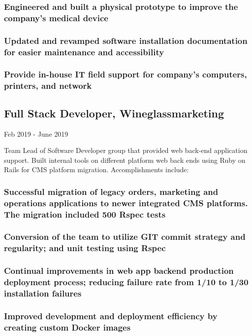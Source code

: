\documentclass{article}
\begin{document}
    	\subsubsection{Engineered and built a physical prototype to improve the company's medical device}
		\subsubsection{Updated and revamped software installation documentation for easier maintenance and accessibility}
    	\subsubsection{Provide in-house IT field support for company’s computers, printers, and network}

    \subsection{Full Stack Developer, Wineglassmarketing} Feb 2019 - June 2019
            
        \vspace{0mm}
        Team Lead of Software Developer group that provided web back-end application support. Built internal tools on different platform web back ends using Ruby on Rails for CMS platform migration. Accomplishments include:

        \vspace{-2mm}
        \subsubsection{Successful migration of legacy orders, marketing and operations applications to newer integrated CMS platforms. The migration included 500 Rspec tests}
        \subsubsection{Conversion of the team to utilize GIT commit strategy and regularity; and unit testing using Rspec}
        \subsubsection{Continual improvements in web app backend production deployment process; reducing failure rate from 1/10 to 1/30 installation failures}
        \subsubsection{Improved development and deployment efficiency by creating custom Docker images}
        
\end{document}

